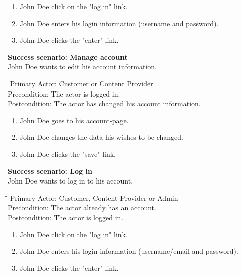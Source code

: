 \begin{enumerate} \setlength{\itemsep}{-1mm}
	\item John Doe click on the "log in" link.
	\item John Doe enters his login information (username and password).
	\item John Doe clicks the "enter" link.
\end{enumerate}
\vspace{3mm}
\textbf{Success scenario: Manage account} \\
John Doe wants to edit his account information.
\begin{tabbing}
\hspace{5mm}\=\hspace{26mm}\=\kill
\>Primary Actor:\> Customer or Content Provider\\
\>Precondition:\> The actor is logged in.\\
\>Postcondition:\> The actor has changed his account information.
\end{tabbing}
\begin{enumerate} \setlength{\itemsep}{-1mm}
	\item John Doe goes to his account-page.
	\item John Doe changes the data his wishes to be changed.
	\item John Doe clicks the "save" link.
\end{enumerate}
\vspace{3mm}
\textbf{Success scenario: Log in} \\
John Doe wants to log in to his account. 
\begin{tabbing}
\hspace{5mm}\=\hspace{26mm}\=\kill
\>Primary Actor:\> Customer, Content Provider or Admin\\
\>Precondition:\> The actor already has an account.\\
\>Postcondition:\> The actor is logged in.
\end{tabbing}
\begin{enumerate} \setlength{\itemsep}{-1mm}
	\item John Doe click on the "log in" link.
	\item John Doe enters his login information (username/email and password). 
	\item John Doe clicks the "enter" link. 
\end{enumerate}
